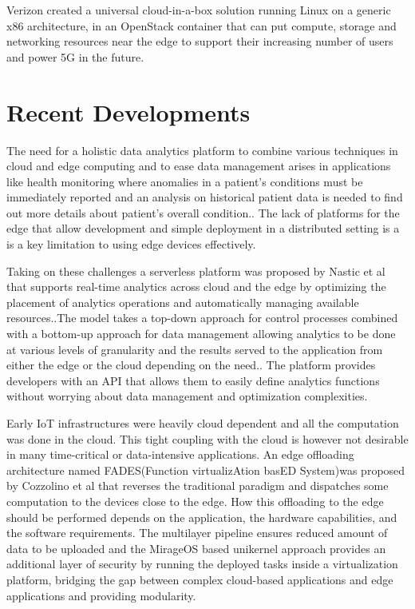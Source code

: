 \documentclass[sigconf]{acmart}
\begin{document}
Verizon created a universal cloud-in-a-box solution running Linux on a generic x86 architecture, in an OpenStack container that can put compute, storage and networking resources near the edge to support their increasing number of users and power 5G in the future.\cite{open_stack_living_on_edge}\cite{open_stack_verizon}

\section{Recent Developments}
The need for a holistic data analytics platform to combine various techniques in cloud and edge computing and to ease data management arises in applications like health monitoring where anomalies in a patient's conditions must be immediately reported and an analysis on historical patient data is needed to find out more details about patient's overall condition.\cite{ieee-serverless-platform-edge}. The lack of platforms for the edge that allow development and simple deployment in a distributed setting is a is a key limitation to using edge devices effectively\cite{ieee_iot_cloud_analytics_newsletter}.

Taking on these challenges a serverless platform was proposed by Nastic et al that supports real-time analytics across cloud and the edge by optimizing the placement of analytics operations and automatically managing available resources.\cite{ieee-serverless-platform-edge}.The model takes a top-down approach for control processes combined with a bottom-up approach for data management allowing analytics to be done at various levels of granularity and the results served to the application from either the edge or the cloud depending on the need.\cite{ieee-serverless-platform-edge}. The platform provides developers with an API that allows them to easily define analytics functions without worrying about data management and optimization complexities. 

Early IoT infrastructures were heavily cloud dependent and all the computation was done in the cloud. This tight coupling with the cloud is however not  desirable in many time-critical or data-intensive applications.\cite{FADES-offloading} An edge offloading architecture named FADES(Function virtualizAtion basED System)was proposed by Cozzolino et al that reverses the traditional paradigm and dispatches some computation to the devices close to the edge. How this offloading to the edge should be performed depends on the application, the hardware capabilities, and the software requirements. \cite{FADES-offloading} The multilayer pipeline ensures reduced amount of data to be uploaded and the MirageOS based unikernel approach provides an additional layer of security by running the deployed tasks inside a virtualization platform, bridging the gap between complex cloud-based applications and edge applications and providing modularity.\cite{FADES-offloading}
\end{document}
